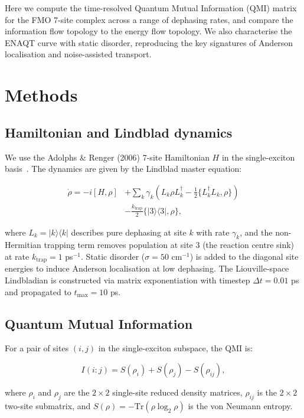 \documentclass[aps,jcp,twocolumn,showpacs,superscriptaddress]{revtex4-2}
\begin{document}
Here we compute the time-resolved Quantum Mutual Information (QMI) matrix for the FMO 7-site complex across a range of dephasing rates, and compare the information flow topology to the energy flow topology. We also characterise the ENAQT curve with static disorder, reproducing the key signatures of Anderson localisation and noise-assisted transport.

\section{Methods}

\subsection{Hamiltonian and Lindblad dynamics}

We use the Adolphs \& Renger (2006) 7-site Hamiltonian $H$ in the single-exciton basis~\cite{Adolphs2006}. The dynamics are given by the Lindblad master equation:

\[
\begin{aligned}
\dot{\rho} = -i[H, \rho] &+ \sum_k \gamma_k (L_k \rho L_k^\dagger - \tfrac12\{L_k^\dagger L_k, \rho\}) \\
&- \frac{k_{\mathrm{trap}}}{2}\{|3\rangle\langle3|, \rho\},
\end{aligned}
\]

where $L_k = |k\rangle\langle k|$ describes pure dephasing at site $k$ with rate $\gamma_k$, and the non-Hermitian trapping term removes population at site 3 (the reaction centre sink) at rate $k_{\mathrm{trap}} = 1$ ps$^{-1}$. Static disorder ($\sigma = 50$ cm$^{-1}$) is added to the diagonal site energies to induce Anderson localisation at low dephasing. The Liouville-space Lindbladian is constructed via matrix exponentiation with timestep $\Delta t = 0.01$ ps and propagated to $t_{\max} = 10$ ps.

\subsection{Quantum Mutual Information}

For a pair of sites $(i,j)$ in the single-exciton subspace, the QMI is:

\[
I(i:j) = S(\rho_i) + S(\rho_j) - S(\rho_{ij}),
\]

where $\rho_i$ and $\rho_j$ are the $2\times2$ single-site reduced density matrices, $\rho_{ij}$ is the $2\times2$ two-site submatrix, and $S(\rho) = -\mathrm{Tr}(\rho \log_2 \rho)$ is the von Neumann entropy.
\end{document}

